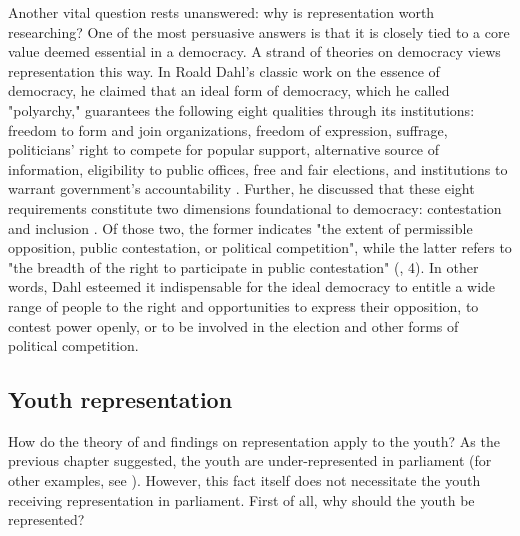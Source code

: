 \documentclass[a4paper, 12pt]{article}\usepackage[dvipdfmx]{graphicx}\usepackage[]{xcolor}
\begin{document}
Another vital question rests unanswered: why is representation worth researching? One of the most persuasive answers is that it is closely tied to a core value deemed essential in a democracy. A strand of theories on democracy views representation this way. In Roald Dahl's classic work on the essence of democracy, he claimed that an ideal form of democracy, which he called "polyarchy," guarantees the following eight qualities through its institutions: freedom to form and join organizations, freedom of expression, suffrage, politicians' right to compete for popular support, alternative source of information, eligibility to public offices, free and fair elections, and institutions to warrant government's accountability \citep{dahl2008polyarchy}. Further, he discussed that these eight requirements constitute two dimensions foundational to democracy: contestation and inclusion \citep{dahl2008polyarchy, coppedge2008two}. Of those two, the former indicates "the extent of permissible opposition, public contestation, or political competition", while the latter refers to "the breadth of the right to participate in public contestation" (\citet{dahl2008polyarchy}, 4). In other words, Dahl esteemed it indispensable for the ideal democracy to entitle a wide range of people to the right and opportunities to express their opposition, to contest power openly, or to be involved in the election and other forms of political competition. 

\subsection{Youth representation} \label{ch3.2}

How do the theory of and findings on representation apply to the youth? As the previous chapter suggested, the youth are under-represented in parliament (for other examples, see \citet{joshi2013representation, mcclean2020thesis, stockemer2023young}). However, this fact itself does not necessitate the youth receiving representation in parliament. First of all, why should the youth be represented? 
\end{document}
